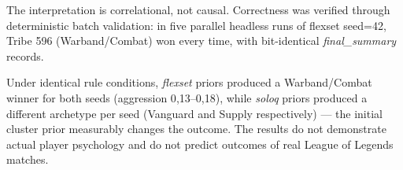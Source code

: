 The interpretation is correlational, not causal. Correctness was verified through deterministic batch validation: in five parallel headless runs of flexset seed=42, Tribe 596 (Warband/Combat) won every time, with bit-identical \textit{final\_summary} records.

Under identical rule conditions, \textit{flexset} priors produced a Warband/Combat winner for both seeds (aggression 0{,}13--0{,}18), while \textit{soloq} priors produced a different archetype per seed (Vanguard and Supply respectively) --- the initial cluster prior measurably changes the outcome. The results do not demonstrate actual player psychology and do not predict outcomes of real League of Legends matches.
